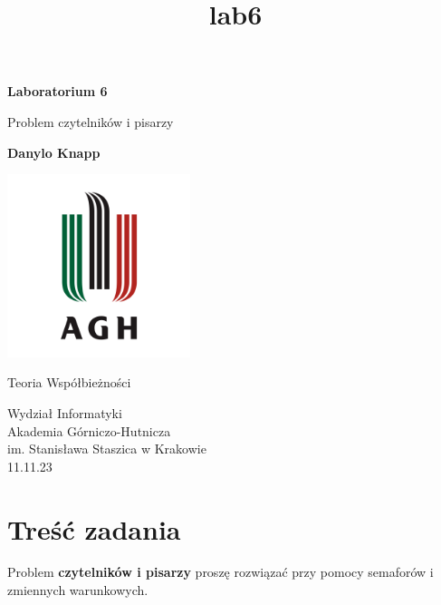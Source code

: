 \documentclass[11pt]{article}
\title{lab6}
\begin{document}
    
    \begin{titlepage}
        \begin{center}
            \vspace*{1cm}
    
            \textbf{Laboratorium 6}
    
            \vspace{0.5cm}
            Problem czytelników i pisarzy
                
            \vspace{1.5cm}
    
            \textbf{Danylo Knapp}

            \vfill

            \includegraphics[width=0.4\textwidth]{../report-templates/agh-logo.png}
    
            \vfill
                
            Teoria Współbieżności
                
            \vspace{0.8cm}

            Wydział Informatyki\\
            Akademia Górniczo-Hutnicza\\
            im. Stanisława Staszica w Krakowie\\
            11.11.23
                
        \end{center}
    \end{titlepage}
    
    

    
    \hypertarget{treux15bux107-zadania}{%
\section{Treść zadania}\label{treux15bux107-zadania}}

Problem \textbf{czytelników i pisarzy} proszę rozwiązać przy pomocy
semaforów i zmiennych warunkowych.
\end{document}
